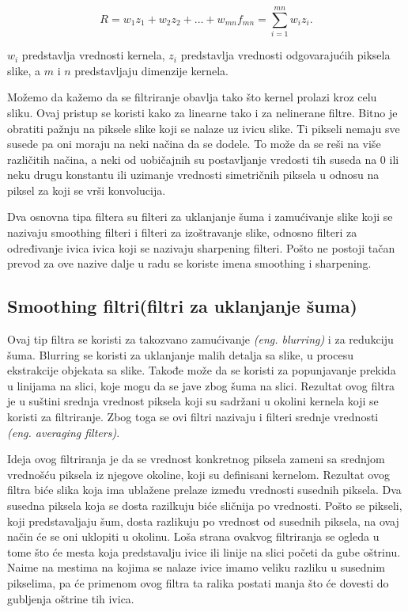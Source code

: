 \documentclass[a4paper,12pt,titlepage]{article}
\begin{document}
\begin{equation}\label{eq:conv5}
R = w_{1}z_{1} + w_{2}z_{2} + \dots + w_{mn}f_{mn} = \sum_{i = 1}^{mn} w_{i}z_{i}.
\end{equation}

$w_{i}$ predstavlja vrednosti kernela, $z_{i}$ predstavlja vrednosti odgovarajućih piksela slike, a $m$ i $n$ predstavljaju dimenzije kernela.

Možemo da kažemo da se filtriranje obavlja tako što kernel prolazi kroz celu sliku. Ovaj pristup se koristi kako za linearne tako i za nelinerane filtre. Bitno je obratiti pažnju na piksele slike koji se nalaze uz ivicu slike. Ti pikseli nemaju sve susede pa oni moraju na neki načina da se dodele. To može da se reši na više različitih načina, a neki od uobičajnih su postavljanje vredosti tih suseda na 0 ili neku drugu konstantu ili uzimanje vrednosti simetričnih piksela u odnosu na piksel za koji se vrši konvolucija. 

Dva osnovna tipa filtera su filteri za uklanjanje šuma i zamućivanje slike koji se nazivaju smoothing filteri i filteri za izoštravanje slike, odnosno filteri za određivanje ivica ivica koji se nazivaju sharpening filteri. Pošto ne postoji tačan prevod za ove nazive dalje u radu se koriste imena smoothing i sharpening.

\subsection{Smoothing filtri(filtri za uklanjanje šuma)}%

Ovaj tip filtra se koristi za takozvano zamućivanje \emph{(eng. blurring)} i za redukciju šuma. Blurring se koristi za uklanjanje malih detalja sa slike, u procesu ekstrakcije objekata sa slike. Takođe može da se koristi za popunjavanje prekida u linijama na slici, koje mogu da se jave zbog šuma na slici. Rezultat ovog filtra je u suštini srednja vrednost piksela koji su sadržani u okolini kernela koji se koristi za filtriranje. Zbog toga se ovi filtri nazivaju i filteri srednje vrednosti \emph{(eng. averaging filters)}. 

Ideja ovog filtriranja je da se vrednost konkretnog piksela zameni sa srednjom vrednošću piksela iz njegove okoline, koji su definisani kernelom. Rezultat ovog filtra biće slika koja ima ublažene prelaze između vrednosti susednih piksela. Dva susedna piksela koja se dosta razilkuju biće sličnija po vrednosti. Pošto se pikseli, koji predstavaljaju šum, dosta razlikuju po vrednost od susednih piksela, na ovaj način će se oni uklopiti u okolinu. Loša strana ovakvog filtriranja se ogleda u tome što će mesta koja predstavalju ivice ili linije na slici početi da gube oštrinu. Naime na mestima na kojima se nalaze ivice imamo veliku razliku u susednim pikselima, pa će primenom ovog filtra ta ralika postati manja što će dovesti do gubljenja oštrine tih ivica.  
\end{document}
